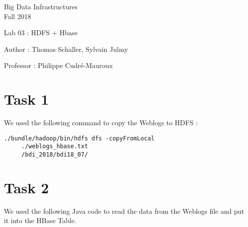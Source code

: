 \documentclass[a4paper,11pt]{report}
\date{\today}
\begin{document}
\begin{center}
\Large{
    Big Data Infrastructures\\
    Fall 2018
  }
  
  \noindent\makebox[\linewidth]{\rule{\linewidth}{0.4pt}}
  Lab 03 : HDFS + Hbase

  \vspace*{1.4cm}

  Author : Thomas Schaller, Sylvain Julmy
  \noindent\makebox[\linewidth]{\rule{\linewidth}{0.4pt}}

  \begin{flushleft}
    Professor : Philippe Cudré-Mauroux
  \end{flushleft}

  \noindent\makebox[\linewidth]{\rule{\textwidth}{1pt}}
\end{center}

\section*{Task 1}

We used the following command to copy the Weblogs to HDFS :

\begin{verbatim}
./bundle/hadoop/bin/hdfs dfs -copyFromLocal 
     ./weblogs_hbase.txt 
     /bdi_2018/bdi18_07/
\end{verbatim}

\section*{Task 2}

We used the following Java code to read the data from the Weblogs file and put
it into the HBase Table.

\setlength{\columnsep}{40pt}
\begin{landscape}
\end{landscape}
\restoregeometry
\end{document}
